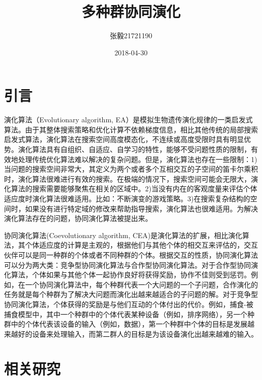 \documentclass[a4paper]{article}
\title{多种群协同演化}
\date{2018-04-30}
\author{张毅\hspace{1em}21721190}
\begin{document}
    
    \maketitle


    \newpage
    \tableofcontents
    

    \newpage
    \section{引言}

    演化算法（Evolutionary algorithm, EA）是模拟生物遗传演化规律的一类启发式算法。由于其整体搜索策略和优化计算不依赖梯度信息，相比其他传统的局部搜索启发式算法，演化算法在搜索空间高度模态化，不连续或高度受限时具有明显优势。演化算法具有自组织、自适应、自学习的特性，能够不受问题性质的限制，有效地处理传统优化算法难以解决的复杂问题\cite{sun_ea}。但是，演化算法也存在一些限制：1)当问题的搜索空间非常大，其定义为两个或者多个互相交互的子空间的笛卡尔乘积时，演化算法很难进行有效的搜索。在极端的情况下，搜索空间可能会无限大，演化算法的搜索需要能够聚焦在相关的区域中。2)当没有内在的客观度量来评估个体适应度时演化算法很难适用。比如：不断演变的游戏策略。3)在搜索复杂结构的空间时，如果没有进行特定域的修改来帮助指导搜索，演化算法也很难适用。为解决演化算法存在的问题，协同演化算法被提出来。
    
    协同演化算法(Coevolutionary algorithm, CEA)是演化算法的扩展，相比演化算法，其个体适应度的计算是主观的，根据他们与其他个体的相交互来评估的，交互伙伴可以是同一种群的个体或者不同种群的个体\cite{wiegand2003analysis}。根据交互的性质，协同演化算法可以分为两大类：竞争型协同演化算法与合作型协同演化算法。对于合作型协同演化算法，个体如果与其他个体一起协作良好将获得奖励，协作不佳则受到惩罚。例如，在一个协同演化算法中，每个种群代表一个大问题的一个子问题，合作演化的任务就是每个种群为了解决大问题而演化出越来越适合的子问题的解。对于竞争型协同演化算法，个体获得的奖励是与他们互动的个体付出的代价。例如，捕食-被捕食模型中，其中一个种群中的个体代表某种设备（例如，排序网络），另一个种群中的个体代表该设备的输入（例如，数据），第一个种群中个体的目标是发展越来越好的设备来处理输入，而第二群人的目标是为该设备演化出越来越难的输入。


    \newpage
    \section{相关研究}
    
\end{document}
